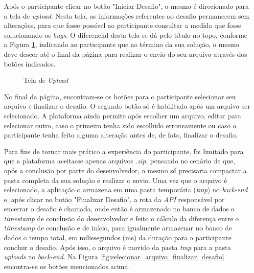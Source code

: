 \documentclass[english,brazilian]{UNISINOSartigo} %
\begin{document}
Após o participante clicar no botão "Iniciar Desafio", o mesmo é direcionado para a tela de \textit{upload}. Nesta tela, as informações referentes ao desafio permanecem sem alterações, para que fosse possível ao participante consultar a medida que fosse solucionando os \textit{bugs}. O diferencial desta tela se dá pelo título no topo, conforme a Figura \ref{fig:tela_upload}, indicando ao participante que ao término da sua solução, o mesmo deve descer até o final da página para realizar o envio do seu arquivo através dos botões indicados. 

\begin{figure}[ht]
    \caption{Tela de \textit{Upload}}
    \label{fig:tela_upload}
    \centering
    \footnotesize
    \begin{minipage}{.9\textwidth}
        \centering
    \end{minipage}
\end{figure}
\FloatBarrier

No final da página, encontram-se os botões para o participante selecionar seu arquivo e finalizar o desafio. O segundo botão só é habilitado após um arquivo ser selecionado. A plataforma ainda permite após escolher um arquivo, editar para selecionar outro, caso o primeiro tenha sido escolhido erroneamente ou caso o participante tenha feito alguma alteração antes de, de fato, finalizar o desafio.

Para fins de tornar mais prático a experiência do participante, foi limitado para que a plataforma aceitasse apenas arquivos \textit{.zip}, pensando no cenário de que, após a conclusão por parte do desenvolvedor, o mesmo só precisaria compactar a pasta completa da sua solução e realizar o envio. Uma vez que o arquivo é selecionado, a aplicação o armazena em uma pasta temporária (\textit{tmp}) no \textit{back-end} e, após clicar no botão "Finalizar Desafio", a rota da \textit{API} responsável por encerrar o desafio é chamada, onde então é armazenado no banco de dados o \textit{timestamp} de conclusão do desenvolvedor e feito o cálculo da diferença entre o \textit{timestamp} de conclusão e de início, para igualmente armazenar no banco de dados o tempo total, em milissegundos (ms) da duração para o participante concluir o desafio. Após isso, o arquivo é movido da pasta \textit{tmp} para a pasta \textit{uploads} no \textit{back-end}. Na Figura \ref{fig:selecionar_arquivo_finalizar_desafio} encontra-se os botões mencionados acima.
\end{document}
